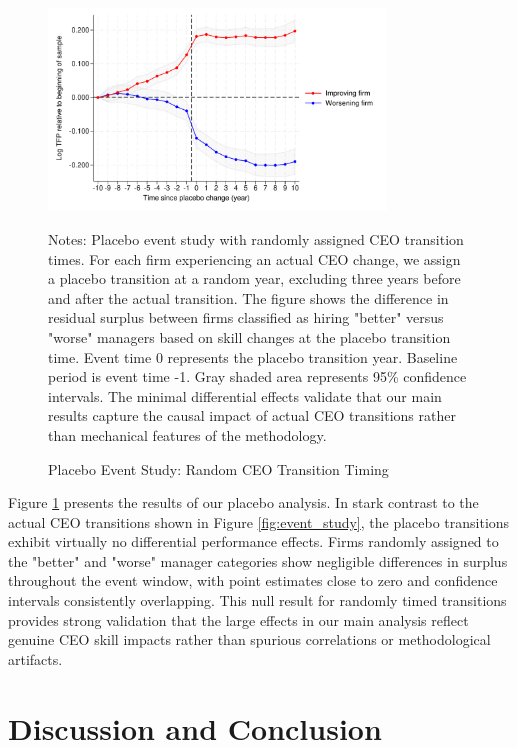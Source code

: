 \documentclass[11pt,a4paper]{article}
\begin{document}
\begin{figure}[htbp]
\centering
\includegraphics[width=0.8\textwidth]{figure/placebo.pdf}
\caption{Placebo Event Study: Random CEO Transition Timing}
\label{fig:placebo}
\footnotesize
Notes: Placebo event study with randomly assigned CEO transition times. For each firm experiencing an actual CEO change, we assign a placebo transition at a random year, excluding three years before and after the actual transition. The figure shows the difference in residual surplus between firms classified as hiring "better" versus "worse" managers based on skill changes at the placebo transition time. Event time 0 represents the placebo transition year. Baseline period is event time -1. Gray shaded area represents 95\% confidence intervals. The minimal differential effects validate that our main results capture the causal impact of actual CEO transitions rather than mechanical features of the methodology.
\end{figure}

Figure \ref{fig:placebo} presents the results of our placebo analysis. In stark contrast to the actual CEO transitions shown in Figure \ref{fig:event_study}, the placebo transitions exhibit virtually no differential performance effects. Firms randomly assigned to the "better" and "worse" manager categories show negligible differences in surplus throughout the event window, with point estimates close to zero and confidence intervals consistently overlapping. This null result for randomly timed transitions provides strong validation that the large effects in our main analysis reflect genuine CEO skill impacts rather than spurious correlations or methodological artifacts.





\section{Discussion and Conclusion}
\end{document}

